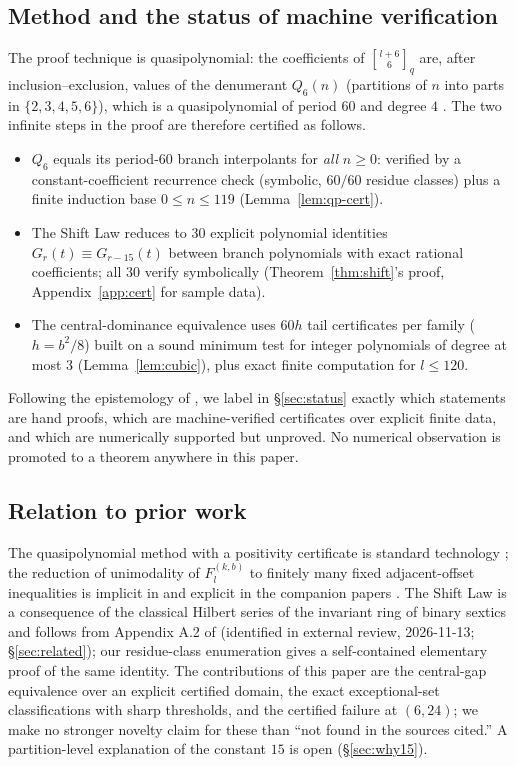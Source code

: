 \documentclass[11pt,reqno]{article}
\theoremstyle{definition}
\newcommand{\ggbrack}[2]{\genfrac{[}{]}{0pt}{}{#1}{#2}_q}
\begin{document}
\subsection*{Method and the status of machine verification}
The proof technique is quasipolynomial: the coefficients of $\ggbrack{l+6}{6}$ are, after inclusion--exclusion, values of the denumerant $Q_6(n)$ (partitions of $n$ into parts in $\{2,3,4,5,6\}$), which is a quasipolynomial of period $60$ and degree $4$ \cite{KR}. The two infinite steps in the proof are therefore certified as follows.
\begin{itemize}
\item $Q_6$ equals its period-$60$ branch interpolants for \emph{all} $n\ge0$: verified by a constant-coefficient recurrence check (symbolic, $60/60$ residue classes) plus a finite induction base $0\le n\le119$ (Lemma~\ref{lem:qp-cert}).
\item The Shift Law reduces to $30$ explicit polynomial identities $G_r(t)\equiv G_{r-15}(t)$ between branch polynomials with exact rational coefficients; all $30$ verify symbolically (Theorem~\ref{thm:shift}'s proof, Appendix~\ref{app:cert} for sample data).
\item The central-dominance equivalence uses $60h$ tail certificates per family ($h=b^2/8$) built on a sound minimum test for integer polynomials of degree at most $3$ (Lemma~\ref{lem:cubic}), plus exact finite computation for $l\le 120$.
\end{itemize}
Following the epistemology of \cite{KUW}, we label in \S\ref{sec:status} exactly which statements are hand proofs, which are machine-verified certificates over explicit finite data, and which are numerically supported but unproved. No numerical observation is promoted to a theorem anywhere in this paper.

\subsection*{Relation to prior work}
The quasipolynomial method with a positivity certificate is standard technology \cite{KUW,KKM}; the reduction of unimodality of $F^{(k,b)}_l$ to finitely many fixed adjacent-offset inequalities is implicit in \cite{RS} and explicit in the companion papers \cite{M06,M07}. The Shift Law is a consequence of the classical Hilbert series of the invariant ring of binary sextics and follows from Appendix A.2 of \cite{KKM} (identified in external review, 2026-11-13; \S\ref{sec:related}); our residue-class enumeration gives a self-contained elementary proof of the same identity. The contributions of this paper are the central-gap equivalence over an explicit certified domain, the exact exceptional-set classifications with sharp thresholds, and the certified failure at $(6,24)$; we make no stronger novelty claim for these than ``not found in the sources cited.'' A partition-level explanation of the constant $15$ is open (\S\ref{sec:why15}).
\end{document}
